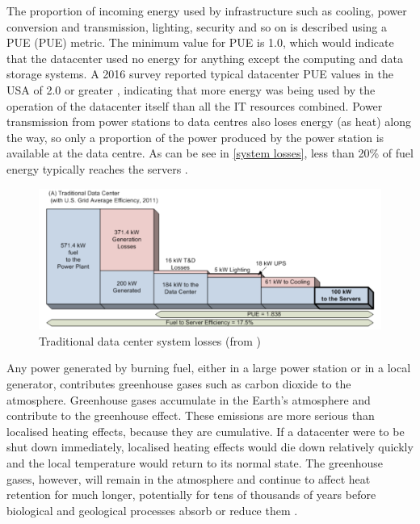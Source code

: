 The proportion of incoming energy used by infrastructure such as cooling, power conversion and transmission, lighting, security and so on is described using a \gls{PUE} (PUE) metric. The minimum value for PUE is 1.0, which would indicate that the datacenter used no energy for anything except the computing and data storage systems. A 2016 survey reported typical datacenter PUE values in the USA of 2.0 or greater \citep{Shehabi2016}, indicating that more energy was being used by the operation of the datacenter itself than all the IT resources combined. Power transmission from power stations to data centres also loses energy (as heat) along the way, so only a proportion of the power produced by the power station is available at the data centre. As can be see in \autoref{system losses}, less than 20\% of fuel energy typically reaches the servers \citep{Zhao2016}.

\begin{figure}[htbp]
  \centering
  \includegraphics[width=\columnwidth]{Figures/Data-Center-Power.png}
  \caption{Traditional data center system losses (from \protect\citet{Zhao2016})}
  \label{system losses}
\end{figure}

Any power generated by burning fuel, either in a large power station or in a local generator, contributes \gls{greenhouse gases} such as carbon dioxide to the atmosphere. Greenhouse gases accumulate in the Earth's atmosphere and contribute to the \gls{greenhouse effect}. These emissions are more serious than localised heating effects, because they are cumulative. If a datacenter were to be shut down immediately, localised heating effects would die down relatively quickly and the local temperature would return to its normal state. The greenhouse gases, however, will remain in the atmosphere and continue to affect heat retention for much longer, potentially for tens of thousands of years before biological and geological processes absorb or reduce them \citep{Pierrehumbert2019}.

